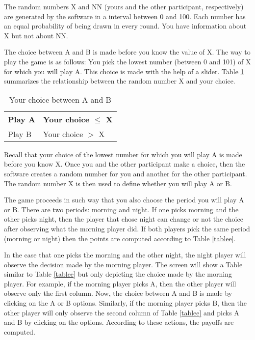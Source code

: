 \documentclass[12pt,english]{article}
\begin{document}
The random numbers X and NN (yours and the other participant, respectively) are generated by the software in a interval between 0 and 100. Each number has an equal probability of being drawn in every round. You have information about X but not about NN. 

The choice between A and B is made before you know the value of X. The way to play the game is as follows: You pick the lowest number (between 0 and 101) of X for which you will play A. This choice is made with the help of a slider. Table \ref{tableef} summarizes the relationship between the random number X and your choice. 

\begin{table}[!ht]
\centering
\begin{tabular}{l|l}
Play A & Your choice $\leq$ X \\
\hline
Play B & Your choice $>$  X  \\
\end{tabular}
\caption{Your choice between A and B}
\label{tableef}
\end{table}

Recall that your choice of the lowest number for which you will play A is made before you know X. Once you and the other participant make a choice, then the software creates a random number for you and another for the other participant. The random number X is then used to define whether you will play A or B. 

The game proceeds in such way that you also choose the period you will play A or B. There are two periods: morning and night. If one picks morning and the other picks night, then the player that chose night can change or not the choice after observing what the morning player did. If both players pick the same period (morning or night) then the points are computed according to Table \ref{tablee}. 

In the case that one picks the morning and the other night, the night player will observe the decision made by the morning player. The screen will show a Table similar to Table \ref{tablee} but only depicting the choice made by the morning player. For example, if the morning player picks A, then the other player will observe only the first column. Now, the choice between A and B is made by clicking on the A or B options. Similarly, if the morning player picks B, then the other player will only observe the second column of Table \ref{tablee} and picks A and B by clicking on the options. According to these actions, the payoffs are computed. 
\end{document}
